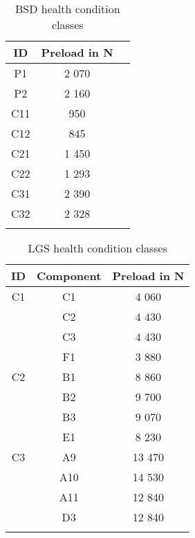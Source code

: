 \newpage

\begin{center}
\begin{longtable}{c c c} 
\toprule
 ID & Preload in N \\ [0.5ex] 
\midrule
 P1 & 2 070 \\ 
 P2 & 2 160 \\ 
 C11 & 950 \\ 
 C12 & 845 \\ 
 C21 & 1 450 \\ [1ex] 
 C22 & 1 293 \\ [1ex] 
 C31 & 2 390 \\ [1ex] 
 C32 & 2 328 \\ [1ex] 
\bottomrule
\caption {BSD health condition classes}
\label {tab:BSDs_states}
\end{longtable}
\end{center}

\begin{center}
\begin{longtable}{c c c} 
\toprule
 ID & Component & Preload in N \\ [0.5ex] 
\midrule
 C1 & C1 & 4 060 \\ 
    & C2 & 4 430 \\ 
    & C3 & 4 430 \\
    & F1 & 3 880 \\ 
\midrule
 C2 & B1 & 8 860 \\ 
    & B2 & 9 700 \\ [1ex] 
    & B3 & 9 070 \\ [1ex]
    & E1 & 8 230 \\ [1ex]
\midrule
 C3 & A9 & 13 470 \\ 
    & A10 & 14 530 \\ [1ex] 
    & A11 & 12 840 \\ [1ex]
    & D3 & 12 840 \\ [1ex]
\bottomrule
\caption {LGS health condition classes}
\label {tab:LGSs_states}
\end{longtable}
\end{center}

\begin{comment}
\begin{center}
\begin{longtable}{c c c c c c c c c c} 
\toprule
&&&&BSD&&&&
\cmidrule(lr){3-11}
  & & C31 & C21 & C11 & P1 & C22 & C12 & C32 & P2  \\ [0.5ex] 
\cmidrule(lr){3-11}
                          & C1 & 1 & 2 & 3 & 4 & 5 & 6 & 7 & 9 \\ 
LGS                       & C2 & 10 & 11 & 12 & 13 & 14 & 15 & 16 & 18  \\ 
                          & C3 & 19 & 20 & 21 & 22 & 23 & 24 & 25 & 27  \\
\bottomrule
\caption {Combinations of LGS and BSD health condition states}
\label {tab:recorded_combinations_of_LGS_and_BSD_health_conditions}
\end{longtable}
\end{center}
\end{comment}






